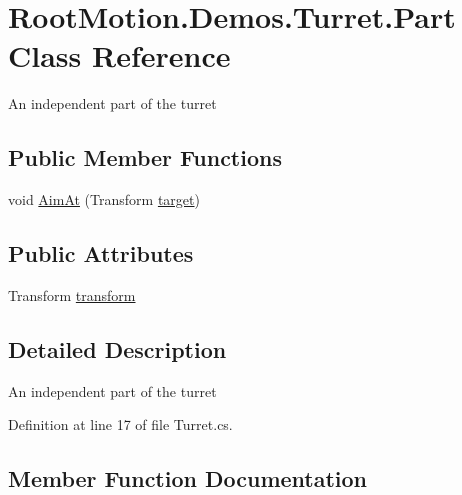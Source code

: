 \hypertarget{class_root_motion_1_1_demos_1_1_turret_1_1_part}{}\section{Root\+Motion.\+Demos.\+Turret.\+Part Class Reference}
\label{class_root_motion_1_1_demos_1_1_turret_1_1_part}


An independent part of the turret  


\subsection*{Public Member Functions}
\begin{DoxyCompactItemize}
\item 
void \mbox{\hyperlink{class_root_motion_1_1_demos_1_1_turret_1_1_part_a351199c01af072d7524369bd2810743e}{Aim\+At}} (Transform \mbox{\hyperlink{class_root_motion_1_1_demos_1_1_turret_a5dac9143646347dc9376b707e13556c5}{target}})
\end{DoxyCompactItemize}
\subsection*{Public Attributes}
\begin{DoxyCompactItemize}
\item 
Transform \mbox{\hyperlink{class_root_motion_1_1_demos_1_1_turret_1_1_part_a0335fa00251dd9a995afa4a42626909b}{transform}}
\end{DoxyCompactItemize}


\subsection{Detailed Description}
An independent part of the turret 



Definition at line 17 of file Turret.\+cs.



\subsection{Member Function Documentation}
\mbox{\label{class_root_motion_1_1_demos_1_1_turret_1_1_part_a351199c01af072d7524369bd2810743e}} 
